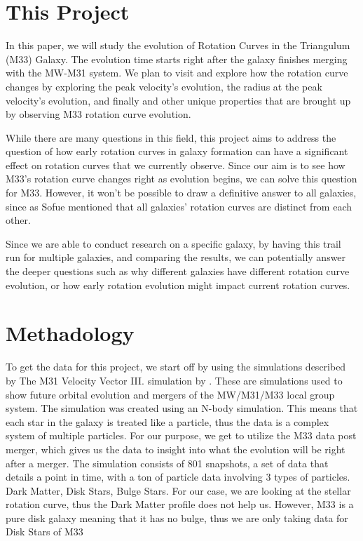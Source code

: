 \documentclass[modern]{aastex61}
\providecommand\citep{\cite}
\begin{document}
\section{This Project}

In this paper, we will study the evolution of Rotation Curves in the Triangulum (M33) Galaxy. The evolution time starts right after the galaxy finishes merging with the MW-M31 system. We plan to visit and explore how the rotation curve changes by exploring the peak velocity's evolution, the radius at the peak velocity's evolution, and finally and other unique properties that are brought up by observing M33 rotation curve evolution.

While there are many questions in this field, this project aims to address the question of how early rotation curves in galaxy formation can have a significant effect on rotation curves that we currently observe. Since our aim is to see how M33's rotation curve changes right as evolution begins, we can solve this question for M33. However, it won't be possible to draw a definitive answer to all galaxies, since as Sofue mentioned \citep{Sofue_2001} that all galaxies' rotation curves are distinct from each other.

Since we are able to conduct research on a specific galaxy, by having this trail run for multiple galaxies, and comparing the results, we can potentially answer the deeper questions such as why different galaxies have different rotation curve evolution, or how early rotation evolution might impact current rotation curves. 



\section {Methadology}

To get the data for this project, we start off by using the simulations described by The M31 Velocity Vector III. simulation by \citep{}\cite{van_der_Marel_2012}. These are simulations used to show future orbital evolution and mergers of the MW/M31/M33 local group system. The simulation was created using an N-body simulation. This means that each star in the galaxy is treated like a particle, thus the data is a complex system of multiple particles. For our purpose, we get to utilize the M33 data post merger, which gives us the data to insight into what the evolution will be right after a merger. The simulation consists of 801 snapshots, a set of data that details a point in time, with a ton of particle data involving 3 types of particles. Dark Matter, Disk Stars, Bulge Stars. For our case, we are looking at the stellar rotation curve, thus the Dark Matter profile does not help us. However, M33 is a pure disk galaxy meaning that it has no bulge, thus we are only taking data for Disk Stars of M33
\end{document}
